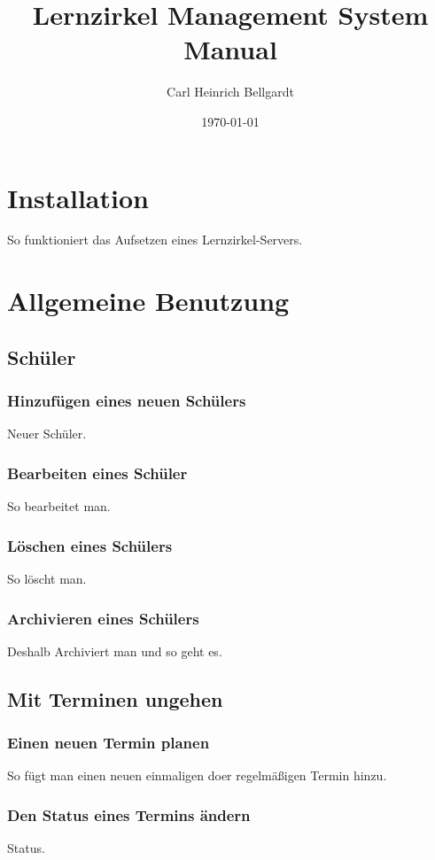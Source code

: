 \documentclass[12pt]{article}
\begin{document}
\begin{titlepage}	
	\title{\LARGE Lernzirkel Management System Manual}
	\date{\small \today}
	\author{\small Carl Heinrich Bellgardt}	
	\clearpage\maketitle
	\thispagestyle{empty}
\end{titlepage}

\setcounter{page}{2}
\tableofcontents
\pagebreak

\section{Installation}
	So funktioniert das Aufsetzen eines Lernzirkel-Servers.
\section{Allgemeine Benutzung}
\subsection{Schüler}
	\subsubsection{Hinzufügen eines neuen Schülers}
		Neuer Schüler.
	\subsubsection{Bearbeiten eines Schüler}
		So bearbeitet man.
	\subsubsection{Löschen eines Schülers}
		So löscht man.
	\subsubsection{Archivieren eines Schülers}
		Deshalb Archiviert man und so geht es.
\subsection{Mit Terminen ungehen}
	\subsubsection{Einen neuen Termin planen}
		So fügt man einen neuen einmaligen doer regelmäßigen Termin hinzu.
	\subsubsection{Den Status eines Termins ändern}
		Status.
\end{document}
